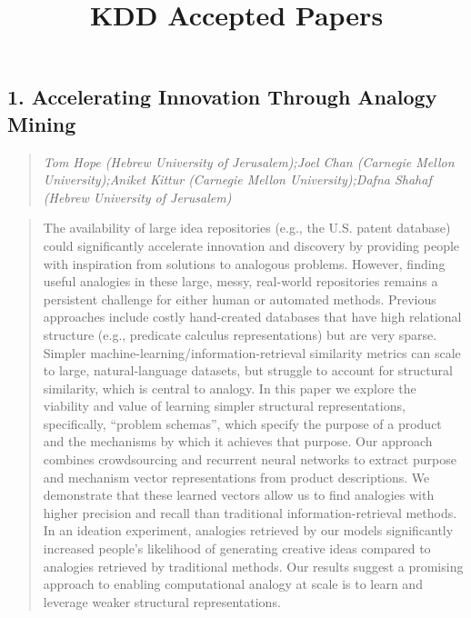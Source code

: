 \documentclass{article}
\title{\textbf{KDD Accepted Papers}}
\begin{document}
\maketitle
\tableofcontents
\pagebreak
\subsection{1. Accelerating Innovation Through Analogy Mining}

\begin{quote}
\footnotesize{\textit{Tom Hope (Hebrew University of Jerusalem);Joel Chan (Carnegie Mellon University);Aniket Kittur (Carnegie Mellon University);Dafna Shahaf (Hebrew University of Jerusalem)}}

\end{quote}

\begin{quote}
The availability of large idea repositories (e.g., the U.S. patent database) could significantly accelerate innovation and discovery by providing people with inspiration from solutions to analogous problems. However, finding useful analogies in these large, messy, real-world repositories remains a persistent challenge for either human or automated methods. Previous approaches include costly hand-created databases that have high relational structure (e.g., predicate calculus representations) but are very sparse. Simpler machine-learning/information-retrieval similarity metrics can scale to large, natural-language datasets, but struggle to account for structural similarity, which is central to analogy. In this paper we explore the viability and value of learning simpler structural representations, specifically, “problem schemas”, which specify the purpose of a product and the mechanisms by which it achieves that purpose. Our approach combines crowdsourcing and recurrent neural networks to extract purpose and mechanism vector representations from product descriptions. We demonstrate that these learned vectors allow us to find analogies with higher precision and recall than traditional information-retrieval methods. In an ideation experiment, analogies retrieved by our models significantly increased people’s likelihood of generating creative ideas compared to analogies retrieved by traditional methods. Our results suggest a promising approach to enabling computational analogy at scale is to learn and leverage weaker structural representations.
\end{quote}
\end{document}
